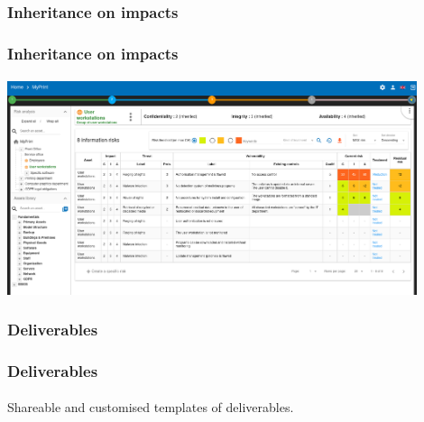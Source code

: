 \subsubsection{Inheritance on impacts}
\begin{frame}
  \frametitle{Inheritance on impacts}
  \framesubtitle{}
  \begin{center}
    \begin{center}
      \includegraphics[width=12cm]{./pictures/impacts-inheritance.png}
    \end{center}
  \end{center}
\end{frame}

\subsubsection{Deliverables}
\begin{frame}
  \frametitle{Deliverables}
  \framesubtitle{}
  Shareable and customised templates of deliverables.
\end{frame}
